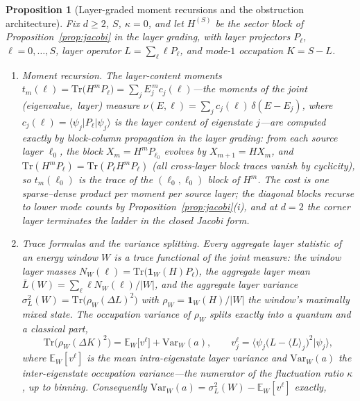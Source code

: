 \documentclass[11pt,a4paper]{article}
\theoremstyle{plain}
\newtheorem{proposition}[theorem]{Proposition}
\theoremstyle{definition}
\theoremstyle{remark}
\begin{document}
\begin{proposition}[Layer-graded moment recursions and the obstruction
architecture]\label{prop:moments}
Fix $d\ge2$, $S$, $\kappa=0$, and let $H^{(S)}$ be the sector block of
Proposition~\ref{prop:jacobi} in the layer grading, with layer projectors
$P_{\ell}$, $\ell=0,\dots,S$, layer operator $L=\sum_{\ell}\ell
P_{\ell}$, and mode-$1$ occupation $K=S-L$.
\begin{enumerate}[leftmargin=1.6em]
\item \emph{Moment recursion.} The layer-content moments
$t_m(\ell)=\mathrm{Tr}\bigl(H^{m}P_{\ell}\bigr)
=\sum_j E_j^{\,m}c_j(\ell)$---the moments of the joint
(eigenvalue,~layer) measure
$\nu(E,\ell)=\sum_j c_j(\ell)\,\delta(E-E_j)$, where
$c_j(\ell)=\langle\psi_j|P_{\ell}|\psi_j\rangle$ is the layer content of
eigenstate $j$---are computed exactly by block-column propagation in the
layer grading: from each source layer $\ell_0$, the block
$X_m=H^{m}P_{\ell_0}$ evolves by $X_{m+1}=HX_m$, and
$\mathrm{Tr}(H^{m}P_{\ell})=\mathrm{Tr}(P_{\ell}H^{m}P_{\ell})$ (all
cross-layer block traces vanish by cyclicity), so $t_m(\ell_0)$ is the
trace of the $(\ell_0,\ell_0)$ block of $H^{m}$. The cost is one
sparse--dense product per moment per source layer; the diagonal blocks
recurse to lower mode counts by Proposition~\ref{prop:jacobi}(i), and at
$d=2$ the corner layer terminates the ladder in the closed Jacobi form.
\item \emph{Trace formulas and the variance splitting.} Every aggregate
layer statistic of an energy window $W$ is a trace functional of the joint
measure: the window layer masses
$N_{W}(\ell)=\mathrm{Tr}\bigl(\mathbf{1}_{W}(H)P_{\ell}\bigr)$, the
aggregate layer mean $\bar L(W)=\sum_{\ell}\ell N_{W}(\ell)/|W|$, and the
aggregate layer variance
$\sigma_L^{2}(W)=\mathrm{Tr}\bigl(\rho_W(\Delta L)^{2}\bigr)$ with
$\rho_W=\mathbf{1}_{W}(H)/|W|$ the window's maximally mixed state. The
occupation variance of $\rho_W$ splits exactly into a quantum and a
classical part,
\begin{equation*}
\mathrm{Tr}\bigl(\rho_W(\Delta K)^{2}\bigr)
=\mathbb{E}_{W}\bigl[v^{\ell}\bigr]+\mathrm{Var}_{W}(a),
\qquad
v^{\ell}_j=\bigl\langle\psi_j\bigl(L-\langle L\rangle_j\bigr)^{2}
\bigr|\psi_j\bigr\rangle,
\end{equation*}
where $\mathbb{E}_W[v^{\ell}]$ is the mean intra-eigenstate layer variance
and $\mathrm{Var}_{W}(a)$ the inter-eigenstate occupation variance---the
numerator of the fluctuation ratio $\kappa$, up to binning. Consequently
$\mathrm{Var}_{W}(a)=\sigma_L^{2}(W)-\mathbb{E}_{W}[v^{\ell}]$ exactly,

\end{enumerate}
\end{proposition}
\end{document}
